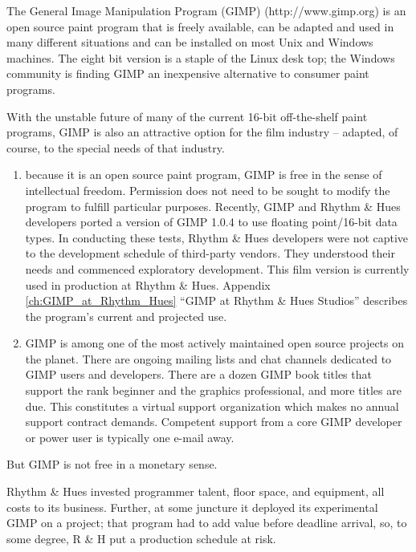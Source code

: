 The General Image Manipulation Program (GIMP) (http://www.gimp.org)
is an open source paint program that is freely available, can be
adapted and used in many different situations and can be installed on
most Unix and Windows machines. The eight bit version is a staple of
the Linux desk top; the Windows community is finding GIMP an
inexpensive alternative to consumer paint programs.

With the unstable future of many of the current 16-bit off-the-shelf paint
programs, GIMP is also an attractive option for the film industry -- adapted,
of course, to the special needs of that industry. 

\begin{enumerate}

\item because it is an open source paint program, GIMP is free in the sense of
intellectual freedom. Permission does not need to be sought to modify
the program to fulfill particular purposes. Recently, GIMP and Rhythm
\& Hues developers ported a version of GIMP 1.0.4 to use floating
point/16-bit data types. In conducting these tests, Rhythm \& Hues developers
were not captive to the development schedule of third-party
vendors. They understood their needs and commenced exploratory
development. This film version is currently used
in production at Rhythm \& Hues. Appendix \ref{ch:GIMP_at_Rhythm_Hues} 
``GIMP at Rhythm \& Hues Studios'' describes the program's
current and projected use.

\item GIMP is among one of the most actively maintained open source projects
on the planet. There are ongoing mailing lists and chat channels
dedicated to GIMP users and developers. There are a dozen GIMP book
titles that support the rank beginner and the graphics professional,
and more titles are due. This constitutes a virtual support
organization which makes no annual support contract demands. Competent
support from a core GIMP developer or power user is typically one
e-mail away.

\end{enumerate}

But GIMP is not free in a monetary sense. 

Rhythm \& Hues invested programmer talent, floor space, and equipment,
all costs to its business. Further, at some juncture it deployed its
experimental GIMP on a project; that program had to add value before
deadline arrival, so, to some degree, R \& H put a production schedule
at risk.

